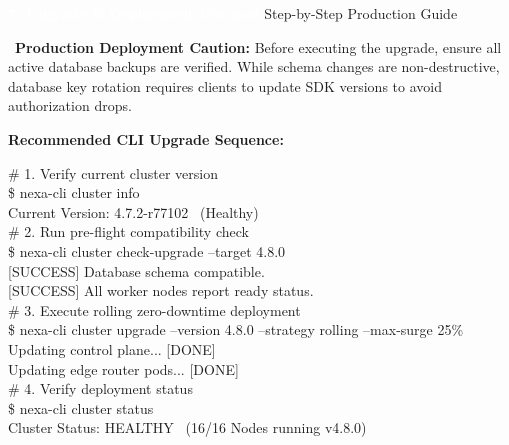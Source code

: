\documentclass[10pt,a4paper]{article}
\newcommand{\sectionTitle}[2]{%
  \vspace{7pt}
  \begin{tcolorbox}[
    enhanced,
    colback=brandPrimary,
    colframe=brandPrimary,
    arc=3pt,
    left=8pt, right=8pt, top=4pt, bottom=4pt,
    boxrule=0pt
  ]
    \textcolor{white}{\large\bfseries #1} \hfill \textcolor{brandAccentLight}{\small\sffamily #2}
  \end{tcolorbox}
  \vspace{1pt}
}
\begin{document}
\vspace{6pt}

\sectionTitle{7. Upgrade \& Deployment Protocol}{Step-by-Step Production Guide}

\begin{tcolorbox}[warningbox]
  \textcolor{badgeSecurityFg}{\faExclamationTriangle\ \bfseries Production Deployment Caution:}
  Before executing the upgrade, ensure all active database backups are verified. While schema changes are non-destructive, database key rotation requires clients to update SDK versions to avoid authorization drops.
\end{tcolorbox}

\vspace{2pt}

\noindent\textcolor{textMuted}{\small\bfseries Recommended CLI Upgrade Sequence:}
\begin{tcolorbox}[codebox]
\# 1. Verify current cluster version \\
\$ nexa-cli cluster info \\
Current Version: 4.7.2-r77102 \ (Healthy) \\[3pt]
\# 2. Run pre-flight compatibility check \\
\$ nexa-cli cluster check-upgrade --target 4.8.0 \\{}
[SUCCESS] Database schema compatible. \\{}
[SUCCESS] All worker nodes report ready status. \\[3pt]
\# 3. Execute rolling zero-downtime deployment \\
\$ nexa-cli cluster upgrade --version 4.8.0 --strategy rolling --max-surge 25\% \\
Updating control plane... [DONE] \\
Updating edge router pods... [DONE] \\[3pt]
\# 4. Verify deployment status \\
\$ nexa-cli cluster status \\
Cluster Status: HEALTHY \ (16/16 Nodes running v4.8.0)
\end{tcolorbox}

\vspace{4pt}
\end{document}
